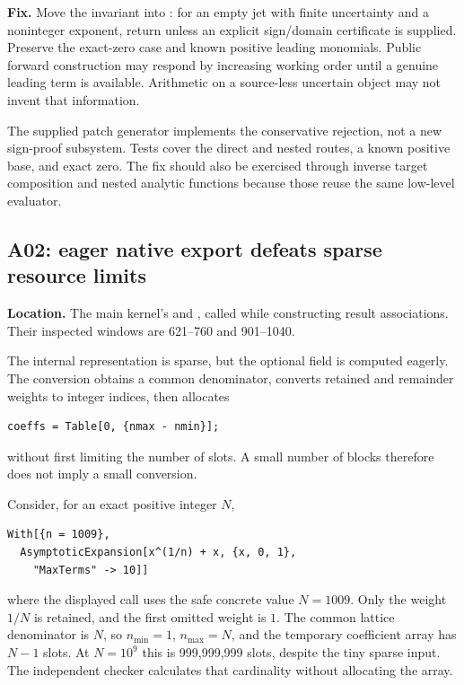 \textbf{Fix.} Move the invariant into : for an empty jet with finite uncertainty and a noninteger exponent, return  unless an explicit sign/domain certificate is supplied. Preserve the exact-zero case and known positive leading monomials. Public forward construction may respond by increasing working order until a genuine leading term is available. Arithmetic on a source-less uncertain object may not invent that information.

The supplied patch generator implements the conservative rejection, not a new sign-proof subsystem. Tests cover the direct and nested routes, a known positive base, and exact zero. The fix should also be exercised through inverse target composition and nested analytic functions because those reuse the same low-level evaluator.

\subsection{A02: eager native export defeats sparse resource limits}\label{sec:a02}

\textbf{Location.} The main kernel's  and , called while constructing result associations. Their inspected windows are 621--760 and 901--1040.\cite{core}

The internal representation is sparse, but the optional  field is computed eagerly. The conversion obtains a common denominator, converts retained and remainder weights to integer indices, then allocates
\begin{lstlisting}
coeffs = Table[0, {nmax - nmin}];
\end{lstlisting}
without first limiting the number of slots. A small number of blocks therefore does not imply a small conversion.

Consider, for an exact positive integer $N$,
\begin{lstlisting}
With[{n = 1009},
  AsymptoticExpansion[x^(1/n) + x, {x, 0, 1},
    "MaxTerms" -> 10]]
\end{lstlisting}
where the displayed call uses the safe concrete value $N=1009$. Only the weight $1/N$ is retained, and the first omitted weight is $1$. The common lattice denominator is $N$, so $n_{\min}=1$, $n_{\max}=N$, and the temporary coefficient array has $N-1$ slots. At $N=10^9$ this is 999,999,999 slots, despite the tiny sparse input. The independent checker calculates that cardinality without allocating the array.

